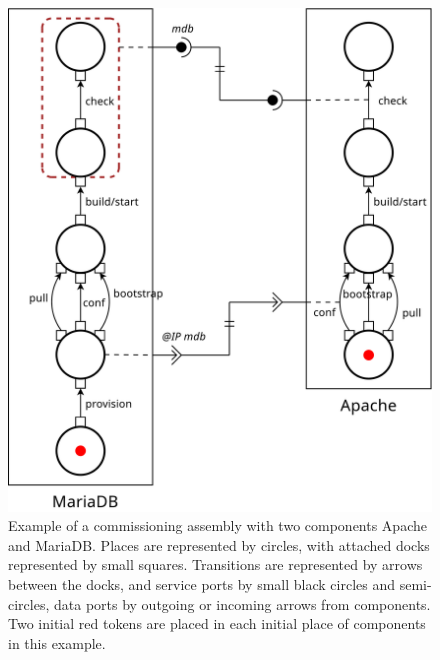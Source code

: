 \begin{figure}[tbp]
  \begin{center}
    \includegraphics[width=0.7\linewidth]{./images/apachebdd.pdf}
  \end{center}
  \caption{Example of a commissioning assembly with two components
    Apache and MariaDB. Places are represented by circles, with attached
    docks represented by small squares. Transitions are represented
    by arrows between the docks, and service ports by small black circles and
    semi-circles, data ports by outgoing or incoming arrows from
    components. Two initial red tokens are placed in each initial
    place of components in this example.}
  \label{fig:example}
\end{figure}

